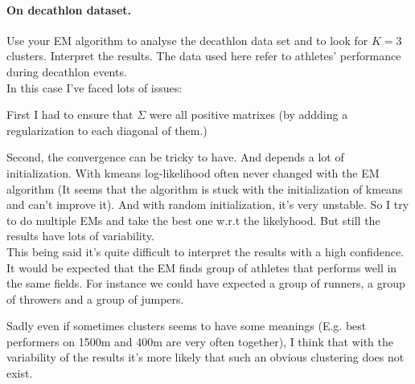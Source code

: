 \documentclass{article}
\begin{document}
\paragraph{On decathlon dataset.} Use your EM algorithm to analyse the decathlon data set and to look for $K=3$ clusters.
Interpret the results. The data used here refer to athletes’ performance during decathlon events.
\vspace*{10px}\\
In this case I've faced lots of issues:

First I had to ensure that $\Sigma$ were all positive matrixes (by addding a regularization to each diagonal of them.)

Second, the convergence can be tricky to have. And depends a lot of initialization. With kmeans log-likelihood often never changed with the EM algorithm
(It seems that the algorithm is stuck with the initialization of kmeans and can't improve it). And with random initialization, it's very unstable.
So I try to do multiple EMs and take the best one w.r.t the likelyhood. But still the results have lots of variability.
\vspace*{10px}\\
This being said it's quite difficult to interpret the results with a high confidence. It would be expected that the EM finds group of athletes
that performs well in the same fields. For instance we could have expected a group of runners, a group of throwers and a group of jumpers.

Sadly even if sometimes clusters seems to have some meanings (E.g. best performers on 1500m and 400m are very often together), I think
that with the variability of the results it's more likely that such an obvious clustering does not exist.
\end{document}
